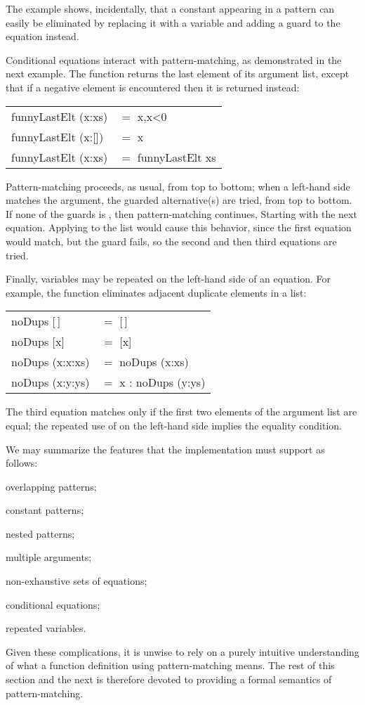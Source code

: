 The  example shows, incidentally, that a constant appearing in a pattern can easily be eliminated by replacing it with a variable and adding a guard to the equation instead.

Conditional equations interact with pattern-matching, as demonstrated in the next example. The function  returns the last element of its argument list, except that if a negative element is encountered then it is returned instead:
\begin{mlcoded}
    \begin{tabular}{ll}
        funnyLastElt (x:xs) &$=$ x,\qquad x<0\\
        funnyLastElt (x:[]) &$=$ x\\
        funnyLastElt (x:xs) &$=$ funnyLastElt xs
    \end{tabular}
\end{mlcoded}
Pattern-matching proceeds, as usual, from top to bottom; when a left-hand side matches the argument, the guarded alternative(s) are tried, from top to bottom. If none of the guards is , then pattern-matching continues, Starting with the next equation. Applying  to the list \ml{[1,2]} would cause this behavior, since the first equation would match, but the guard fails, so the second and then third equations are tried.

Finally, variables may be repeated on the left-hand side of an equation. For example, the function  eliminates adjacent duplicate elements in a list:
\begin{mlcoded}
    \begin{tabular}{ll}
    noDups [\,] &$=$ [\,]\\
    noDups [x] &$=$ [x]\\
    noDups (x:x:xs) &$=$ noDups (x:xs)\\
    noDups (x:y:ys) &$=$ x : noDups (y:ys)
    \end{tabular}
\end{mlcoded}
The third equation matches only if the first two elements of the argument list are equal; the repeated use of  on the left-hand side implies the equality condition.

We may summarize the features that the implementation must support as follows:
\begin{numbered}
    \item overlapping patterns;
    \item constant patterns;
    \item nested patterns;
    \item multiple arguments;
    \item non-exhaustive sets of equations;
    \item conditional equations;
    \item repeated variables.
\end{numbered}
Given these complications, it is unwise to rely on a purely intuitive understanding of what a function definition using pattern-matching means. The rest of this section and the next is therefore devoted to providing a formal semantics of pattern-matching.

